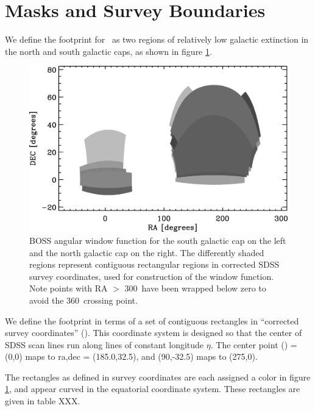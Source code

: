 \documentclass[12pt,preprint]{aastex}
\begin{document}
\section{Masks and Survey Boundaries} \label{sec:masks}

We define the footprint for \boss\ as two regions of relatively low galactic
extinction in the north and south galactic caps, as shown in figure
\ref{fig:footprint}.  

\begin{figure}[t] \centering
 \centering 
 \includegraphics[scale=0.6]{fig/boss-poly-coverage.eps}

 \caption{BOSS angular window function for the south galactic cap on the left
 and the north galactic cap on the right.  The differently shaded regions
 represent contiguous rectangular regions in corrected SDSS survey coordinates,
 used for construction of the window function.  Note points with RA $>$
 300\arcdeg\ have been wrapped below zero to avoid the 360\arcdeg\ crossing
 point.} \label{fig:footprint}

\end{figure}

We define the footprint in terms of a set of contiguous rectangles in
``corrected survey coordinates'' (\etalambda).  This coordinate system is
designed so that the center of SDSS scan lines run along lines of constant
longitude $\eta$.  The center point (\etalambda) = (0,0) maps to ra,dec =
(185.0,32.5), and (90,-32.5) maps to (275,0).

The rectangles as defined in survey coordinates are each assigned a color in
figure \ref{fig:footprint}, and appear curved in the equatorial coordinate
system.  These rectangles are given in table XXX.
\end{document}
